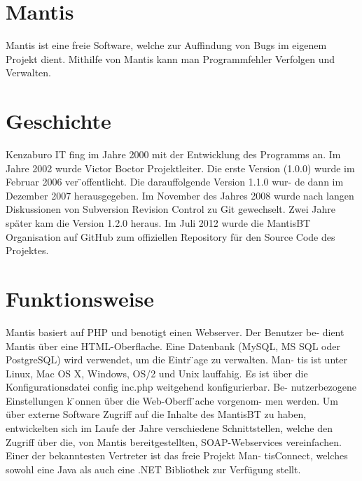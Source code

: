 \section{Mantis}
Mantis ist eine freie Software, welche zur Auffindung von Bugs im eigenem
Projekt dient. Mithilfe von Mantis kann man Programmfehler Verfolgen und
Verwalten.
\section{Geschichte}
Kenzaburo IT fing im Jahre 2000 mit der Entwicklung des Programms an.
Im Jahre 2002 wurde Victor Boctor Projektleiter. Die erste Version (1.0.0)
wurde im Februar 2006 ver ̈offentlicht. Die darauffolgende Version 1.1.0 wur-
de dann im Dezember 2007 herausgegeben. Im November des Jahres 2008
wurde nach langen Diskussionen von Subversion Revision Control zu Git
gewechselt. Zwei Jahre später kam die Version 1.2.0 heraus. Im Juli 2012
wurde die MantisBT Organisation auf GitHub zum offiziellen Repository
für den Source Code des Projektes.
\section{Funktionsweise}
Mantis basiert auf PHP und benotigt einen Webserver. Der Benutzer be-
dient Mantis über eine HTML-Oberflache. Eine Datenbank (MySQL, MS
SQL oder PostgreSQL) wird verwendet, um die Eintr ̈age zu verwalten. Man-
tis ist unter Linux, Mac OS X, Windows, OS/2 und Unix lauffahig. Es ist
über die Konfigurationsdatei config inc.php weitgehend konfigurierbar. Be-
nutzerbezogene Einstellungen k ̈onnen über die Web-Oberfl ̈ache vorgenom-
men werden. Um über externe Software Zugriff auf die Inhalte des MantisBT
zu haben, entwickelten sich im Laufe der Jahre verschiedene Schnittstellen,
welche den Zugriff über die, von Mantis bereitgestellten, SOAP-Webservices
vereinfachen. Einer der bekanntesten Vertreter ist das freie Projekt Man-
tisConnect, welches sowohl eine Java als auch eine .NET Bibliothek zur
Verfügung stellt.
